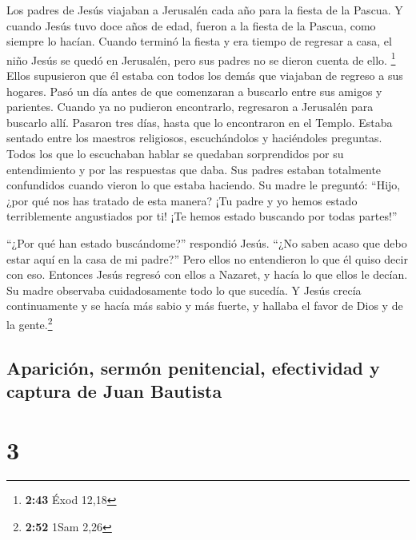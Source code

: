  Los padres de Jesús viajaban a Jerusalén cada año para
la fiesta de la Pascua.  Y cuando Jesús tuvo doce años de
edad, fueron a la fiesta de la Pascua, como siempre lo hacían.
 Cuando terminó la fiesta y era tiempo de regresar a
casa, el niño Jesús se quedó en Jerusalén, pero sus padres no se dieron
cuenta de ello. \footnote{\textbf{2:43} Éxod 12,18} 
Ellos supusieron que él estaba con todos los demás que viajaban de
regreso a sus hogares. Pasó un día antes de que comenzaran a buscarlo
entre sus amigos y parientes.  Cuando ya no pudieron
encontrarlo, regresaron a Jerusalén para buscarlo allí. 
Pasaron tres días, hasta que lo encontraron en el Templo. Estaba sentado
entre los maestros religiosos, escuchándolos y haciéndoles preguntas.
 Todos los que lo escuchaban hablar se quedaban
sorprendidos por su entendimiento y por las respuestas que daba.
 Sus padres estaban totalmente confundidos cuando vieron
lo que estaba haciendo. Su madre le preguntó: ``Hijo, ¿por qué nos has
tratado de esta manera? ¡Tu padre y yo hemos estado terriblemente
angustiados por ti! ¡Te hemos estado buscando por todas partes!''

 ``¿Por qué han estado buscándome?'' respondió Jesús.
``¿No saben acaso que debo estar aquí en la casa de mi padre?''
 Pero ellos no entendieron lo que él quiso decir con eso.
 Entonces Jesús regresó con ellos a Nazaret, y hacía lo
que ellos le decían. Su madre observaba cuidadosamente todo lo que
sucedía.  Y Jesús crecía continuamente y se hacía más
sabio y más fuerte, y hallaba el favor de Dios y de la gente.\footnote{\textbf{2:52}
  1Sam 2,26}

\hypertarget{apariciuxf3n-sermuxf3n-penitencial-efectividad-y-captura-de-juan-bautista}{%
\subsection{Aparición, sermón penitencial, efectividad y captura de Juan
Bautista}\label{apariciuxf3n-sermuxf3n-penitencial-efectividad-y-captura-de-juan-bautista}}

\hypertarget{section-2}{%
\section{3}\label{section-2}}

